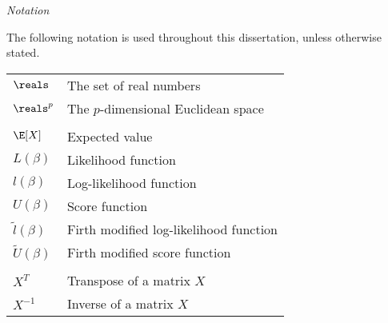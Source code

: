 \thispagestyle{plain}
\begin{center}
    \LARGE{\emph{Notation}}
\end{center}
\vspace{1cm}
The following notation is used throughout this dissertation, unless otherwise stated.
\vspace{1cm}
\begin{center}
	\begin{tabular}{ll}
		$\reals$ & The set of real numbers \\
		$\reals^p$ & The $p$-dimensional Euclidean space \\
		&\\
		$\E[X]$ & Expected value\\
		$L(\beta)$ & Likelihood function\\
		$l(\beta)$ & Log-likelihood function\\
		$U(\beta)$ & Score function\\
		$\tilde{l}(\beta)$ & Firth modified log-likelihood function\\
		$\tilde{U}(\beta)$ & Firth modified score function\\
		&\\
		$X^T$ & Transpose of a matrix $X$\\
		$X^{-1}$ & Inverse of a matrix $X$
	\end{tabular}
\end{center}
